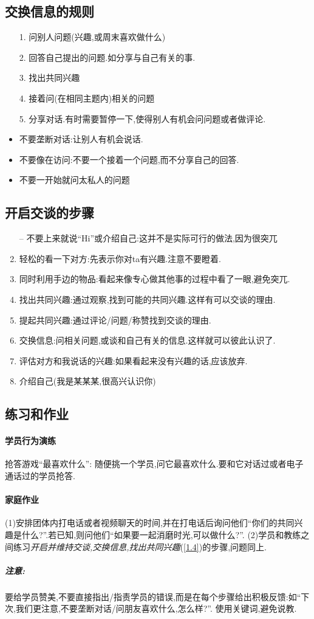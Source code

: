 \documentclass[UTF8]{article}
\newcommand{\indList}{\vspace{-6pt}}
\newcommand{\Exer}{\subsection{练习和作业}}
\newcommand{\exer}{\paragraph*{家庭作业}}
\newcommand{\prac}{\paragraph*{学员行为演练}}
\newcommand{\warn}{\subparagraph*{注意:}}
\newcommand{\dash}{–}
\begin{document}
\subsection{交换信息的规则\label{1.3}}
\indList
\begin{itemize}[label=\dash]
    \item[1.] 问别人问题(兴趣,或周末喜欢做什么)
    \item[2.] 回答自己提出的问题.如分享与自己有关的事.
    \item[3.] 找出共同兴趣
    \item[4.] 接着问(在相同主题内)相关的问题
    \item[5.] 分享对话.有时需要暂停一下,使得别人有机会问问题或者做评论.
    \item 不要垄断对话:让别人有机会说话.
    \item 不要像在访问:不要一个接着一个问题,而不分享自己的回答.
    \item 不要一开始就问太私人的问题
\end{itemize}
\indList

\subsection{开启交谈的步骤\label{1.4}}
\indList
\begin{enumerate}
    \item[\dash] 不要上来就说``Hi''或介绍自己:这并不是实际可行的做法,因为很突兀
    \item 轻松的看一下对方:先表示你对ta有兴趣.注意不要瞪着.
    \item 同时利用手边的物品:看起来像专心做其他事的过程中看了一眼,避免突兀.
    \item 找出共同兴趣:通过观察,找到可能的共同兴趣.这样有可以交谈的理由.
    \item 提起共同兴趣:通过评论/问题/称赞找到交谈的理由.
    \item 交换信息:问相关问题,或谈和自己有关的信息.这样就可以彼此认识了.
    \item 评估对方和我说话的兴趣:如果看起来没有兴趣的话,应该放弃.
    \item 介绍自己(我是某某某,很高兴认识你)
\end{enumerate}
\indList

\Exer
\prac 抢答游戏``最喜欢什么'': 随便挑一个学员,问它最喜欢什么.要和它对话过或者电子通话过的学员抢答.
\exer (1)安排团体内打电话或者视频聊天的时间,并在打电话后询问他们``你们的共同兴趣是什么?''.若已知,则问他们``如果要一起消磨时光,可以做什么?''.
(2)学员和教练之间练习\emph{开启并维持交谈,交换信息,找出共同兴趣}(\ref{1.4})的步骤,问题同上.
\warn 要给学员赞美,不要直接指出/指责学员的错误,而是在每个步骤给出积极反馈:如``下次,我们更注意,不要垄断对话/问朋友喜欢什么,怎么样?''. 使用关键词,避免说教.
\end{document}
